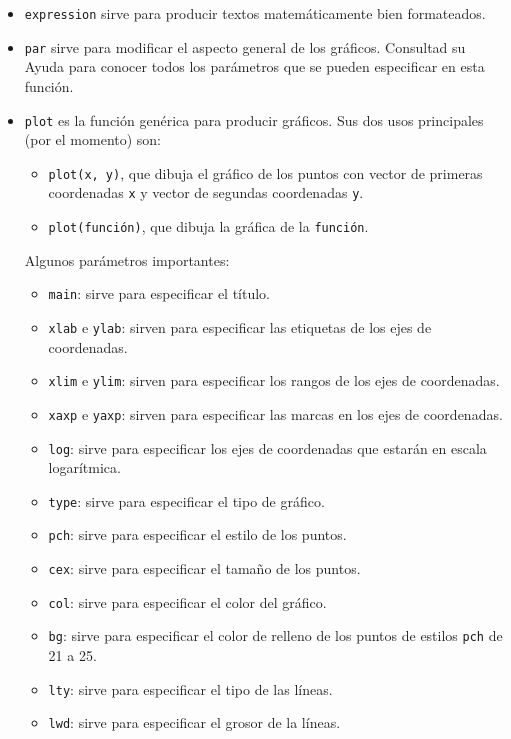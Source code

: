 \documentclass[
]{book}
\providecommand{\tightlist}{%
  \setlength{\itemsep}{0pt}\setlength{\parskip}{0pt}}
\theoremstyle{definition}
\theoremstyle{definition}
\theoremstyle{definition}
\theoremstyle{remark}
\begin{document}
\begin{itemize}
\item
  \texttt{expression} sirve para producir textos matemáticamente bien formateados.
\item
  \texttt{par} sirve para modificar el aspecto general de los gráficos. Consultad su Ayuda para conocer todos los parámetros que se pueden especificar en esta función.
\item
  \texttt{plot} es la función genérica para producir gráficos. Sus dos usos principales (por el momento) son:

  \begin{itemize}
  \tightlist
  \item
    \texttt{plot(x,\ y)}, que dibuja el gráfico de los puntos con vector de primeras coordenadas \texttt{x} y vector de segundas coordenadas \texttt{y}.
  \item
    \texttt{plot(función)}, que dibuja la gráfica de la \texttt{función}.
  \end{itemize}

  Algunos parámetros importantes:

  \begin{itemize}
  \tightlist
  \item
    \texttt{main}: sirve para especificar el título.
  \item
    \texttt{xlab} e \texttt{ylab}: sirven para especificar las etiquetas de los ejes de coordenadas.
  \item
    \texttt{xlim} e \texttt{ylim}: sirven para especificar los rangos de los ejes de coordenadas.
  \item
    \texttt{xaxp} e \texttt{yaxp}: sirven para especificar las marcas en los ejes de coordenadas.
  \item
    \texttt{log}: sirve para especificar los ejes de coordenadas que estarán en escala logarítmica.
  \item
    \texttt{type}: sirve para especificar el tipo de gráfico.
  \item
    \texttt{pch}: sirve para especificar el estilo de los puntos.
  \item
    \texttt{cex}: sirve para especificar el tamaño de los puntos.
  \item
    \texttt{col}: sirve para especificar el color del gráfico.
  \item
    \texttt{bg}: sirve para especificar el color de relleno de los puntos de estilos \texttt{pch} de 21 a 25.
  \item
    \texttt{lty}: sirve para especificar el tipo de las líneas.
  \item
    \texttt{lwd}: sirve para especificar el grosor de la líneas.
  \end{itemize}


\end{itemize}
\end{document}
